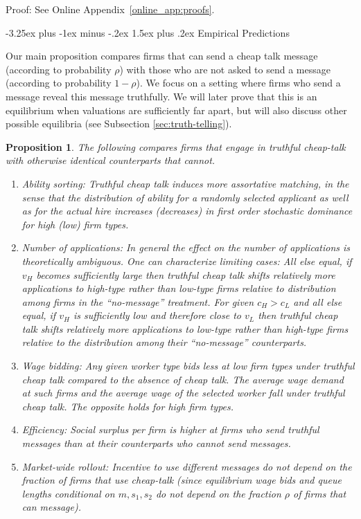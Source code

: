 \documentclass[12pt]{article}
\makeatletter
\renewcommand{\subsection}{%
  \@startsection{subsection}{2}{\z@}%
  {-3.25ex plus -1ex minus -.2ex}%
  {1.5ex plus .2ex}%
  {\normalfont\large\bfseries}%
}
\newtheorem{prop}{Proposition}
\makeatother
\begin{document}
Proof: See Online Appendix~\ref{online_app:proofs}.


\bigskip

\subsection{Empirical Predictions}

Our main proposition compares firms that can send a cheap talk message (according to probability $\rho$) with those who are not asked to send a message (according to probability $1-\rho$). We focus on a setting where firms who send a message reveal this message truthfully. We will later prove that this is an equilibrium when valuations are sufficiently far apart, but will also discuss other possible equilibria  (see Subsection \ref{sec:truth-telling}). 



\begin{prop}
\label{comparison1} The following compares firms that engage in truthful
cheap-talk with otherwise identical counterparts that cannot.

\begin{enumerate}
\item Ability sorting: Truthful cheap talk induces more assortative
matching, in the sense that the distribution of ability for a randomly
selected applicant as well as for the actual hire increases (decreases) in first order stochastic
dominance for high (low) firm types.

\item Number of applications: In general the effect on the number of
applications is theoretically ambiguous. One can characterize limiting cases: All else equal, if $v_H$ becomes sufficiently large then truthful cheap talk shifts relatively more applications to high-type rather than low-type firms relative to distribution among firms in the ``no-message'' treatment. For given $c_H > c_L$ and all else equal, if $v_H$ is sufficiently low and therefore close to $v_L$ then truthful cheap talk shifts relatively more applications to low-type rather than high-type firms relative to the distribution among their ``no-message'' counterparts. 

\item Wage bidding: Any given worker type bids less at low firm types under
truthful cheap talk compared to the absence of cheap talk. The average wage
demand at such firms and the average wage of the selected worker fall under
truthful cheap talk. The opposite holds for high firm types.

\item Efficiency: Social surplus per firm is higher at firms who send
truthful messages than at their counterparts who cannot send messages.

\item Market-wide rollout: Incentive to use  different messages do not depend on the fraction of firms that use cheap-talk (since equilibrium wage bids and queue lengths conditional on $m,s_1,s_2$ do not depend on the fraction $\rho$ of firms that can message). 
\end{enumerate}
\end{prop}
\end{document}
